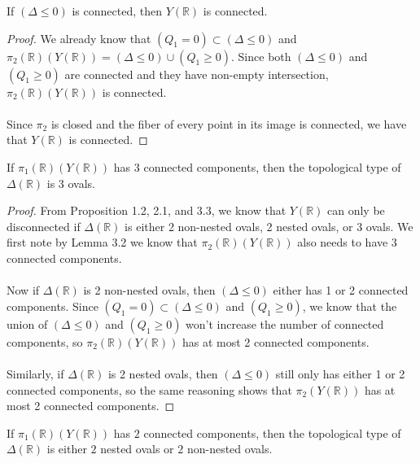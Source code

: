 \documentclass{article}
\newcommand{\Rbb}{\mathbb{R}}
\begin{document}
\begin{lemma}
If $(\Delta \leq 0)$ is connected, then $Y(\Rbb)$ is connected.
\end{lemma}

\begin{proof}
We already know that $(Q_1 = 0) \subset (\Delta \leq 0)$ and $\pi_2(\Rbb)(Y(\Rbb)) = (\Delta \leq 0) \cup (Q_1 \geq 0)$. Since both $(\Delta \leq 0)$ and $(Q_1 \geq 0)$ are connected and they have non-empty intersection, $\pi_2(\Rbb)(Y(\Rbb))$ is connected.\\\\
Since $\pi_2$ is closed and the fiber of every point in its image is connected, we have that $Y(\Rbb)$ is connected.
\end{proof}

\begin{proposition}
If $\pi_1(\Rbb)(Y(\Rbb))$ has $3$ connected components, then the topological type of $\Delta(\Rbb)$ is 3 ovals.
\end{proposition}

\begin{proof}
From Proposition 1.2, 2.1, and 3.3, we know that $Y(\Rbb)$ can only be disconnected if $\Delta(\Rbb)$ is either 2 non-nested ovals, 2 nested ovals, or 3 ovals. We first note by Lemma 3.2 we know that $\pi_2(\Rbb)(Y(\Rbb))$ also needs to have 3 connected components.\\\\
Now if $\Delta(\Rbb)$ is 2 non-nested ovals, then $(\Delta \leq 0)$ either has 1 or 2 connected components. Since $(Q_1 = 0) \subset (\Delta \leq 0)$ and $(Q_1 \geq 0)$, we know that the union of $(\Delta \leq 0)$ and $(Q_1 \geq 0)$ won't increase the number of connected components, so $\pi_2(\Rbb)(Y(\Rbb))$ has at most 2 connected components.\\\\
Similarly, if $\Delta(\Rbb)$ is 2 nested ovals, then $(\Delta \leq 0)$ still only has either 1 or 2 connected components, so the same reasoning shows that $\pi_2(Y(\Rbb))$ has at most 2 connected components.
\end{proof}


\begin{proposition}
If $\pi_1(\Rbb)(Y(\Rbb))$ has $2$ connected components, then the topological type of $\Delta(\Rbb)$ is either $2$ nested ovals or $2$ non-nested ovals.
\end{proposition}
\end{document}
